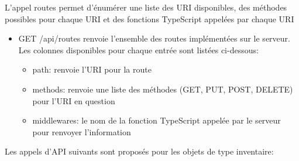 \label{ann:api-routes}
L'appel routes permet d'énumérer une liste des \ac{URI} disponibles, des méthodes possibles pour chaque \ac{URI} et des fonctions TypeScript appelées par chaque \ac{URI}
\begin{itemize}
    \item GET /api/routes renvoie l'ensemble des routes implémentées sur le serveur. Les colonnes disponibles pour chaque entrée sont listées ci-dessous: 
    \begin{itemize}
        \item path: renvoie l'\ac{URI} pour la route
        \item methods: renvoie une liste des méthodes (GET, PUT, POST, DELETE) pour l'\ac{URI} en question
        \item middlewares: le nom de la fonction TypeScript appelée par le serveur pour renvoyer l'information
    \end{itemize}
\end{itemize}
Les appels d'API suivants sont proposés pour les objets de type inventaire:
